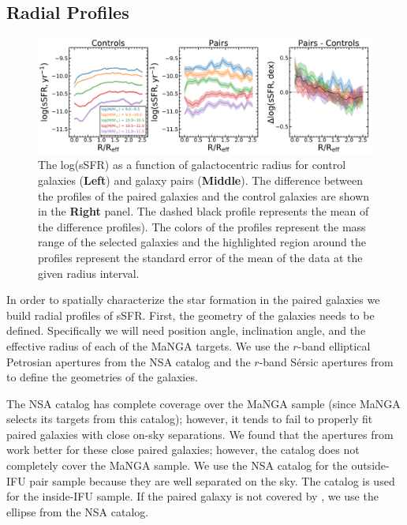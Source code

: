 \documentclass[iop,revtex4,twocolumn,apj,numberedappendix,appendixfloats]{emulateapj}
\newcommand{\ewha}{EW(H$\alpha$)}
\begin{document}

\subsection{Radial Profiles}\label{sec:radial}

\begin{figure}
\centering
\includegraphics[width=\linewidth]{fig/ssfr_comb.pdf}
\caption[]{The log(sSFR) as a function of galactocentric radius for control galaxies (\textbf{Left}) and galaxy pairs (\textbf{Middle}). The difference between the profiles of the paired galaxies and the control galaxies are shown in the \textbf{Right} panel. The dashed black profile represents the mean of the difference profiles). The colors of the profiles represent the mass range of the selected galaxies and the highlighted region around the profiles represent the standard error of the mean of the data at the given radius interval.}
\label{fig:ssfr_prof}
\end{figure}

In order to spatially characterize the star formation in the paired galaxies we build radial profiles of sSFR. First, the geometry of the galaxies needs to be defined. Specifically we will need position angle, inclination angle, and the effective radius of each of the MaNGA targets. We use the $r$-band elliptical Petrosian apertures from the NSA catalog and the $r$-band S\'ersic apertures from \citet{Simard:2011} to define the geometries of the galaxies. 

The NSA catalog has complete coverage over the MaNGA sample (since MaNGA selects its targets from this catalog); however, it tends to fail to properly fit paired galaxies with close on-sky separations. We found that the apertures from \citet{Simard:2011} work better for these close paired galaxies; however, the catalog does not completely cover the MaNGA sample. We use the NSA catalog for the outside-IFU pair sample because they are well separated on the sky. The \citet{Simard:2011} catalog is used for the inside-IFU sample. If the paired galaxy is not covered by \citet{Simard:2011}, we use the ellipse from the NSA catalog. 
\end{document}
